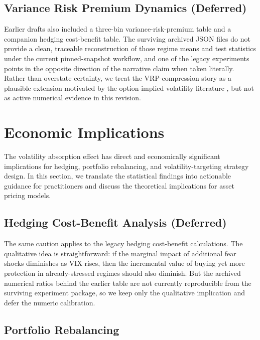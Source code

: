 \documentclass[12pt,a4paper]{article}
\begin{document}
\subsection{Variance Risk Premium Dynamics (Deferred)}
\label{sec:vrp}

Earlier drafts also included a three-bin variance-risk-premium table and a companion hedging cost-benefit table. The surviving archived JSON files do not provide a clean, traceable reconstruction of those regime means and test statistics under the current pinned-snapshot workflow, and one of the legacy experiments points in the opposite direction of the narrative claim when taken literally. Rather than overstate certainty, we treat the VRP-compression story as a plausible extension motivated by the option-implied volatility literature \citep{bollerslev2009, carr2009, todorov2010, drechsler2011, bekaert2022}, but not as active numerical evidence in this revision.


\section{Economic Implications}
\label{sec:implications}

The volatility absorption effect has direct and economically significant implications for hedging, portfolio rebalancing, and volatility-targeting strategy design. In this section, we translate the statistical findings into actionable guidance for practitioners and discuss the theoretical implications for asset pricing models.

\subsection{Hedging Cost-Benefit Analysis (Deferred)}

The same caution applies to the legacy hedging cost-benefit calculations. The qualitative idea is straightforward: if the marginal impact of additional fear shocks diminishes as VIX rises, then the incremental value of buying yet more protection in already-stressed regimes should also diminish. But the archived numerical ratios behind the earlier table are not currently reproducible from the surviving experiment package, so we keep only the qualitative implication and defer the numeric calibration.

\subsection{Portfolio Rebalancing}
\end{document}
